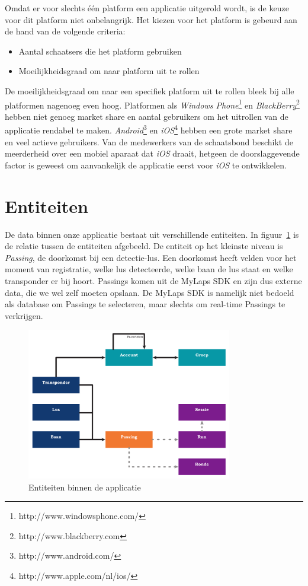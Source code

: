 Omdat er voor slechts één platform een applicatie uitgerold wordt, is de keuze voor dit platform niet onbelangrijk. Het kiezen voor het platform is gebeurd aan de hand van de volgende criteria:
\begin{itemize}
\item Aantal schaatsers die het platform gebruiken
\item Moeilijkheidsgraad om naar platform uit te rollen
\end{itemize}

De moeilijkheidsgraad om naar een specifiek platform uit te rollen bleek bij alle platformen nagenoeg even hoog. Platformen als \textit{Windows Phone}\footnote{http://www.windowsphone.com/} en \textit{BlackBerry}\footnote{http://www.blackberry.com} hebben niet genoeg market share en aantal gebruikers om het uitrollen van de applicatie rendabel te maken. \textit{Android}\footnote{http://www.android.com/} en \textit{iOS}\footnote{http://www.apple.com/nl/ios/} hebben een grote market share en veel actieve gebruikers. Van de medewerkers van de schaatsbond beschikt de meerderheid over een mobiel aparaat dat \textit{iOS} draait, hetgeen de doorslaggevende factor is geweest om aanvankelijk de applicatie eerst voor \textit{iOS} te ontwikkelen.

\section{Entiteiten}
De data binnen onze applicatie bestaat uit verschillende entiteiten. In figuur~\ref{fig:entities} is de relatie tussen de entiteiten afgebeeld. De entiteit op het kleinste niveau is \textit{Passing}, de doorkomst bij een detectie-lus. Een doorkomst heeft velden voor het moment van registratie, welke lus detecteerde, welke baan de lus staat en welke transponder er bij hoort. Passings komen uit de MyLaps SDK en zijn dus externe data, die we wel zelf moeten opslaan. De MyLaps SDK is namelijk niet bedoeld als database om Passings te selecteren, maar slechts om real-time Passings te verkrijgen.

\begin{figure}
\centering
\includegraphics[width=0.8\textwidth]{style/images/Entiteiten}
\caption{Entiteiten binnen de applicatie}
\label{fig:entities}
\end{figure}


